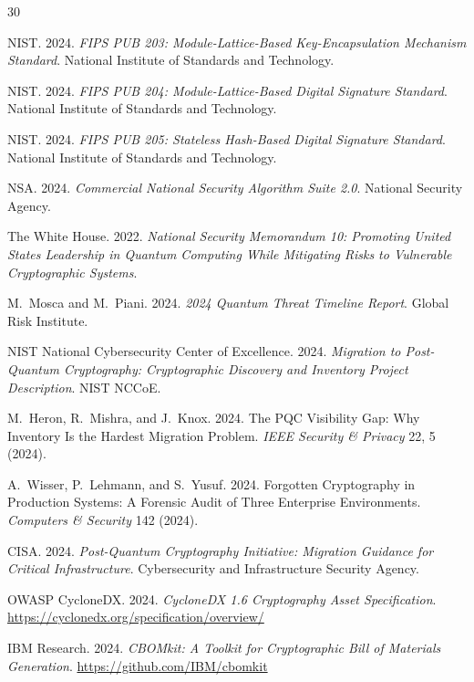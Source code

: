 \documentclass[sigconf,nonacm]{acmart}
\begin{document}
\sloppy

\begin{thebibliography}{30}

NIST. 2024. \textit{FIPS PUB 203: Module-Lattice-Based Key-Encapsulation
Mechanism Standard}. National Institute of Standards and Technology.

NIST. 2024. \textit{FIPS PUB 204: Module-Lattice-Based Digital
Signature Standard}. National Institute of Standards and Technology.

NIST. 2024. \textit{FIPS PUB 205: Stateless Hash-Based Digital
Signature Standard}. National Institute of Standards and Technology.

NSA. 2024. \textit{Commercial National Security Algorithm Suite 2.0}.
National Security Agency.

The White House. 2022. \textit{National Security Memorandum 10:
Promoting United States Leadership in Quantum Computing While
Mitigating Risks to Vulnerable Cryptographic Systems}.

M.~Mosca and M.~Piani. 2024. \textit{2024 Quantum Threat Timeline
Report}. Global Risk Institute.

NIST National Cybersecurity Center of Excellence. 2024.
\textit{Migration to Post-Quantum Cryptography: Cryptographic Discovery
and Inventory Project Description}. NIST NCCoE.

M.~Heron, R.~Mishra, and J.~Knox. 2024. The PQC Visibility Gap:
Why Inventory Is the Hardest Migration Problem.
\textit{IEEE Security \& Privacy} 22, 5 (2024).

A.~Wisser, P.~Lehmann, and S.~Yusuf. 2024. Forgotten Cryptography in
Production Systems: A Forensic Audit of Three Enterprise Environments.
\textit{Computers \& Security} 142 (2024).

CISA. 2024. \textit{Post-Quantum Cryptography Initiative: Migration
Guidance for Critical Infrastructure}. Cybersecurity and Infrastructure
Security Agency.

OWASP CycloneDX. 2024. \textit{CycloneDX 1.6 Cryptography Asset
Specification}. \url{https://cyclonedx.org/specification/overview/}

IBM Research. 2024. \textit{CBOMkit: A Toolkit for Cryptographic Bill
of Materials Generation}.
\url{https://github.com/IBM/cbomkit}


\end{thebibliography}
\end{document}
